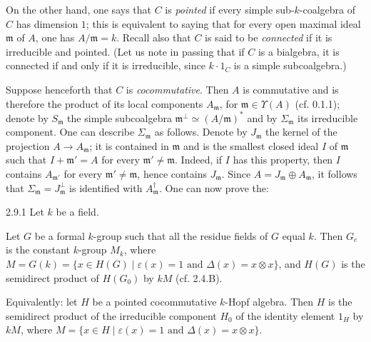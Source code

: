 On the other hand, one says that $C$ is \emph{pointed} if every simple sub-$k$-coalgebra of $C$ has dimension $1$; this is equivalent to saying that for every open maximal ideal $\mathfrak m$ of $A$, one has $A/\mathfrak m=k$. Recall also that $C$ is said to be \emph{connected} if it is irreducible and pointed. (Let us note in passing that if $C$ is a bialgebra, it is connected if and only if it is irreducible, since $k\cdot1_C$ is a simple subcoalgebra.)

Suppose henceforth that $C$ is \emph{cocommutative}. Then $A$ is commutative and is therefore the product of its local components $A_{\mathfrak m}$, for $\mathfrak m\in\Upsilon(A)$ (cf. 0.1.1); denote by $S_{\mathfrak m}$ the simple subcoalgebra $\mathfrak m^\perp\simeq(A/\mathfrak m)^*$ and by $\Sigma_{\mathfrak m}$ its irreducible component. One can describe $\Sigma_{\mathfrak m}$ as follows. Denote by $J_{\mathfrak m}$ the kernel of the projection $A\to A_{\mathfrak m}$; it is contained in $\mathfrak m$ and is the smallest closed ideal $I$ of $\mathfrak m$ such that $I+\mathfrak m'=A$ for every $\mathfrak m'\ne\mathfrak m$. Indeed, if $I$ has this property, then $I$ contains $A_{\mathfrak m'}$ for every $\mathfrak m'\ne\mathfrak m$, hence contains $J_{\mathfrak m}$. Since $A=J_{\mathfrak m}\oplus A_{\mathfrak m}$, it follows that $\Sigma_{\mathfrak m}=J_{\mathfrak m}^\perp$ is identified with $A_{\mathfrak m}^\dagger$. One can now prove the:
\begin{proposition}{2.9.1}\label{VIIB.2.9.1}
Let $k$ be a field.
\begin{enumeratei}
\item Let $G$ be a formal $k$-group such that all the residue fields of $G$ equal $k$. Then $G_e$ is the constant $k$-group $M_k$, where $M=G(k)=\{x\in H(G)\mid\varepsilon(x)=1\text{ and }\Delta(x)=x\otimes x\}$, and $H(G)$ is the semidirect product of $H(G_0)$ by $kM$ (cf. 2.4.B).
\item Equivalently: let $H$ be a pointed cocommutative $k$-Hopf algebra. Then $H$ is the semidirect product of the irreducible component $H_0$ of the identity element $1_H$ by $kM$, where $M=\{x\in H\mid\varepsilon(x)=1\text{ and }\Delta(x)=x\otimes x\}$.
\end{enumeratei}
\end{proposition}
